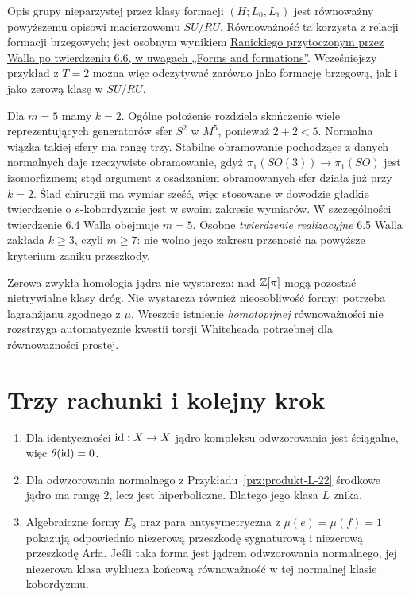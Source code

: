 Opis grupy nieparzystej przez klasy formacji
$(H;L_0,L_1)$ jest równoważny powyższemu
opisowi macierzowemu $SU/RU$. Równoważność
ta korzysta z relacji formacji brzegowych;
jest osobnym wynikiem
\href{https://www.maths.ed.ac.uk/~v1ranick/books/scm.pdf}
{Ranickiego przytoczonym przez Walla po
twierdzeniu 6.6, w uwagach „Forms and formations”}.
Wcześniejszy przykład z $T=2$ można więc
odczytywać zarówno jako formację brzegową,
jak i jako zerową klasę w $SU/RU$.

\begin{uwaga}
\label{uwaga:wall-odd-five-22}
Dla $m=5$ mamy $k=2$. Ogólne położenie
rozdziela skończenie wiele reprezentujących
generatorów sfer $S^2$ w $M^5$, ponieważ
$2+2<5$. Normalna wiązka takiej sfery ma
rangę trzy. Stabilne obramowanie pochodzące
z danych normalnych daje rzeczywiste
obramowanie, gdyż
$\pi_1(SO(3))\to\pi_1(SO)$ jest izomorfizmem;
stąd argument z osadzaniem obramowanych
sfer działa już przy $k=2$. Ślad chirurgii
ma wymiar sześć, więc stosowane w dowodzie
gładkie twierdzenie o $s$-kobordyzmie jest
w swoim zakresie wymiarów. W szczególności
twierdzenie 6.4 Walla obejmuje $m=5$.
Osobne \emph{twierdzenie realizacyjne} 6.5
Walla zakłada $k\geq3$, czyli $m\geq7$:
nie wolno jego zakresu przenosić na
powyższe kryterium zaniku przeszkody.
\end{uwaga}

\begin{uwaga}
\label{uwaga:homologia-L-22}
Zerowa zwykła homologia jądra nie wystarcza:
nad $\mathbb{Z}[\pi]$ mogą pozostać nietrywialne
klasy dróg. Nie wystarcza również nieosobliwość
formy: potrzeba lagranżjanu zgodnego z $\mu$.
Wreszcie istnienie \emph{homotopijnej}
równoważności nie rozstrzyga automatycznie
kwestii torsji Whiteheada potrzebnej dla
równoważności prostej.
\end{uwaga}

\section{Trzy rachunki i kolejny krok}
\label{sec:przyklady-L-22}

\begin{enumerate}[label=(\arabic*)]
\item Dla identyczności $\mathrm{id}:X\to X$ jądro
kompleksu odwzorowania jest ściągalne, więc
$\theta(\mathrm{id})=0$.
\item Dla odwzorowania normalnego z
Przykładu~\ref{prz:produkt-L-22} środkowe
jądro ma rangę $2$, lecz jest hiperboliczne.
Dlatego jego klasa $L$ znika.
\item Algebraiczne formy $E_8$ oraz para
antysymetryczna z $\mu(e)=\mu(f)=1$
pokazują odpowiednio niezerową przeszkodę
sygnaturową i niezerową przeszkodę Arfa.
Jeśli taka forma jest jądrem odwzorowania normalnego,
jej niezerowa klasa wyklucza końcową
równoważność w tej normalnej klasie kobordyzmu.
\end{enumerate}

